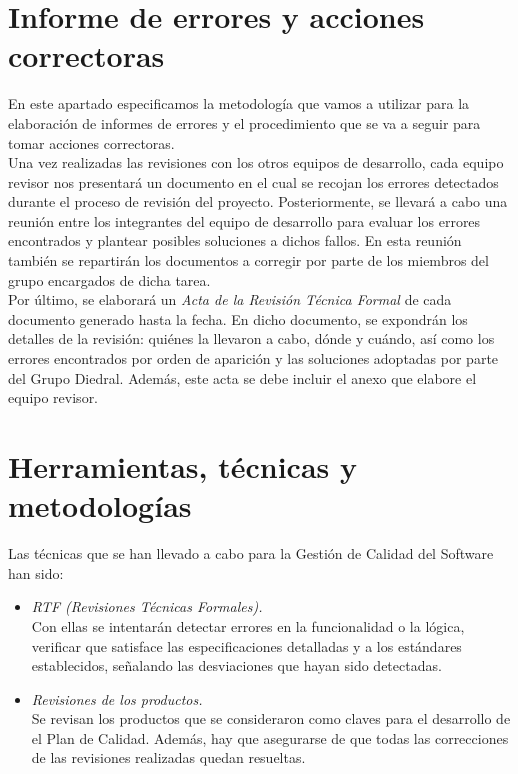 \documentclass[11pt, a4paper, twoside, titlepage]{article}
\begin{document}
	\section{Informe de errores y acciones correctoras} %
		En este apartado especificamos la metodología que vamos a utilizar para la elaboración de informes de errores y el procedimiento que se va a seguir para tomar acciones correctoras. \\

		Una vez realizadas las revisiones con los otros equipos de desarrollo, cada equipo revisor nos presentará un documento en el cual se recojan los errores detectados durante el proceso de revisión del proyecto. Posteriormente, se llevará a cabo una reunión entre los integrantes del equipo de desarrollo para evaluar los errores encontrados y plantear posibles soluciones a dichos fallos. En esta reunión también se repartirán los documentos a corregir por parte de los miembros del grupo encargados de dicha tarea. \\

		Por último, se elaborará un \textit{Acta de la Revisión Técnica Formal} de cada documento generado hasta la fecha. En dicho documento, se expondrán los detalles de la revisión: quiénes la llevaron a cabo, dónde y cuándo, así como los errores encontrados por orden de aparición %
 y las soluciones adoptadas por parte del Grupo Diedral. Además, este acta se debe incluir el anexo que elabore el equipo revisor.
	
	\section{Herramientas, técnicas y metodologías} %
		Las técnicas que se han llevado a cabo para la Gestión de Calidad del Software han sido:

		\begin{itemize}
			\item \textit{RTF (Revisiones Técnicas Formales).} \\
				Con ellas se intentarán detectar errores en la funcionalidad o la lógica, verificar que satisface las especificaciones detalladas y a los estándares establecidos, señalando las desviaciones que hayan sido detectadas.
			\item \textit{Revisiones de los productos.} \\
				Se revisan los productos que se consideraron como claves para el desarrollo de el Plan de Calidad. Además, hay que asegurarse de que todas las correcciones de las revisiones realizadas quedan resueltas.
		 \end{itemize}
\end{document}

